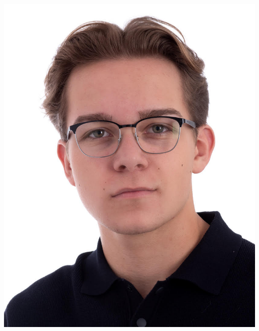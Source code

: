 \documentclass[letterpaper,11pt]{article}
\begin{document}
  \begin{minipage}[t]{0.17\textwidth}
    \vspace{0pt}
    \centering
    \includegraphics[width=\textwidth]{assets/unnamed.jpg}
  \end{minipage}
\end{document}
